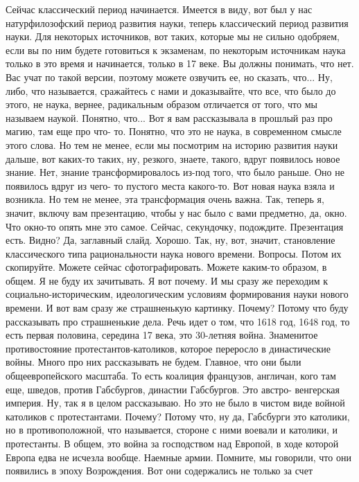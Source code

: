  Сейчас классический период начинается. Имеется в виду, вот был у нас
натурфилозофский период развития науки, теперь классический период развития
науки. Для некоторых источников, вот таких, которые мы не сильно одобряем, если
вы по ним будете готовиться к экзаменам, по некоторым источникам наука только в
это время и начинается, только в 17 веке. Вы должны понимать, что нет. Вас учат
по такой версии, поэтому можете озвучить ее, но сказать, что... Ну, либо, что
называется, сражайтесь с нами и доказывайте, что все, что было до этого, не
наука, вернее, радикальным образом отличается от того, что мы называем наукой.
Понятно, что... Вот я вам рассказывала в прошлый раз про магию, там еще про что-
то. Понятно, что это не наука, в современном смысле этого слова. Но тем не
менее, если мы посмотрим на историю развития науки дальше, вот каких-то таких,
ну, резкого, знаете, такого, вдруг появилось новое знание. Нет, знание
трансформировалось из-под того, что было раньше. Оно не появилось вдруг из чего-
то пустого места какого-то. Вот новая наука взяла и возникла. Но тем не менее,
эта трансформация очень важна. Так, теперь я, значит, включу вам презентацию,
чтобы у нас было с вами предметно, да, окно. Что окно-то опять мне это самое.
Сейчас, секундочку, подождите. Презентация есть. Видно? Да, заглавный слайд.
Хорошо. Так, ну, вот, значит, становление классического типа рациональности
наука нового времени. Вопросы. Потом их скопируйте. Можете сейчас
сфотографировать. Можете каким-то образом, в общем. Я не буду их зачитывать. Я
вот почему. И мы сразу же переходим к социально-историческим, идеологическим
условиям формирования науки нового времени. И вот вам сразу же страшненькую
картинку. Почему? Потому что буду рассказывать про страшненькие дела. Речь идет
о том, что 1618 год, 1648 год, то есть первая половина, середина 17 века, это
30-летняя война. Знаменитое противостояние протестантов-католиков, которое
переросло в династические войны. Много про них рассказывать не будем. Главное,
что они были общеевропейского масштаба. То есть коалиция французов, англичан,
кого там еще, шведов, против Габсбургов, династии Габсбургов. Это австро-
венгерская империя. Ну, так я в целом рассказываю. Но это не было в чистом виде
войной католиков с протестантами. Почему? Потому что, ну да, Габсбурги это
католики, но в противоположной, что называется, стороне с ними воевали и
католики, и протестанты. В общем, это война за господством над Европой, в ходе
которой Европа едва не исчезла вообще. Наемные армии. Помните, мы говорили, что
они появились в эпоху Возрождения. Вот они содержались не только за счет
